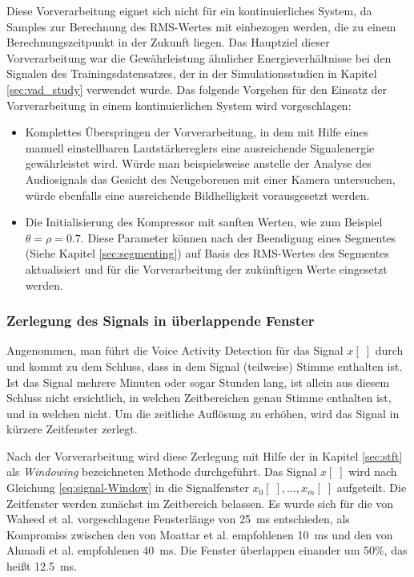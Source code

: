 Diese Vorverarbeitung eignet sich nicht für ein kontinuierliches System, da Samples zur Berechnung des RMS-Wertes mit einbezogen werden, die zu einem Berechnungszeitpunkt in der Zukunft liegen. Das Hauptziel dieser Vorverarbeitung war die Gewährleistung ähnlicher Energieverhältnisse bei den Signalen des Trainingsdatensatzes, der in der Simulationsstudien in Kapitel \ref{sec:vad_study} verwendet wurde. Das folgende Vorgehen für den Einsatz der Vorverarbeitung in einem kontinuierlichen System wird vorgeschlagen:
\begin{itemize}
	\item Komplettes Überspringen der Vorverarbeitung, in dem mit Hilfe eines manuell einstellbaren Lautstärkereglers eine ausreichende Signalenergie gewährleistet wird. Würde man beispielsweise anstelle der Analyse des Audiosignals das Gesicht des Neugeborenen mit einer Kamera untersuchen, würde ebenfalls eine ausreichende Bildhelligkeit vorausgesetzt werden.
	\item Die Initialisierung des Kompressor mit \grqq sanften Werten\grqq , wie zum Beispiel $\theta = \rho = 0.7$. Diese Parameter können nach der Beendigung eines Segmentes (Siehe Kapitel \ref{sec:segmenting}) auf Basis des RMS-Wertes des Segmentes aktualisiert und für die Vorverarbeitung der zukünftigen Werte eingesetzt werden.
\end{itemize}

\subsubsection{Zerlegung des Signals in überlappende Fenster}
\label{sec:windowing}

Angenommen, man führt die Voice Activity Detection für das Signal $x[\;]$ durch und kommt zu dem Schluss, dass in dem Signal (teilweise) Stimme enthalten ist. Ist das Signal mehrere Minuten oder sogar Stunden lang, ist allein aus diesem Schluss nicht ersichtlich, in welchen Zeitbereichen genau Stimme enthalten ist, und in welchen nicht. Um die zeitliche Auflösung zu erhöhen, wird das Signal in kürzere Zeitfenster zerlegt.

Nach der Vorverarbeitung wird diese Zerlegung mit Hilfe der in Kapitel \ref{sec:stft} als \emph{Windowing} bezeichneten Methode durchgeführt. Das Signal $x[\;]$ wird nach Gleichung \ref{eq:signal-Window} in die Signalfenster $x_0[\;] , \ldots , x_m[\;]$ aufgeteilt. Die Zeitfenster werden zunächst im Zeitbereich belassen. Es wurde sich für die von Waheed et al. \cite{vad_entropy} vorgeschlagene Fensterlänge von \SI{25}{\milli\second} entschieden, als Kompromiss zwischen den von Moattar et al. \cite{vad_Easy} empfohlenen \SI{10}{\milli\second} und den von Ahmadi et al. \cite{vad_ceps} empfohlenen \SI{40}{\milli\second}. Die Fenster überlappen einander um 50\%, das heißt \SI{12.5}{\milli\second}.

